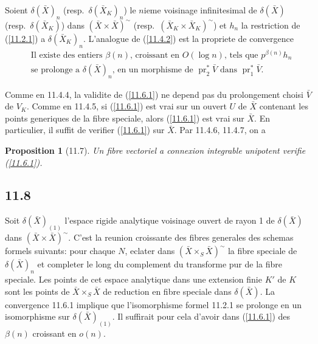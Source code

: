 \documentclass[12pt,a4paper]{article}
\theoremstyle{plain}
\newtheorem{proposition}[theorem]{Proposition}
\theoremstyle{definition}
\theoremstyle{remark}
\DeclareMathOperator{\pr}{pr}
\begin{document}
Soient $\delta(\bar{X})_n$ (resp.~$\delta(\bar{X}_K)_n$) le $n$ieme voisinage infinitesimal de $\delta(\bar{X})$ (resp.~$\delta(\bar{X}_K)$) dans $(\bar{X} \times \bar{X})^\sim$ (resp.~$(\bar{X}_K \times \bar{X}_K)^\sim$) et $h_n$ la restriction de (\ref{11.2.1}) a $\delta(\bar{X}_K)_n$. L'analogue de (\ref{11.4.2}) est la propriete de convergence
\begin{equation}\label{11.6.1}
\begin{aligned}
&\text{Il existe des entiers } \beta(n) \text{, croissant en } O(\log n) \text{, tels que } p^{\beta(n)} h_n \\
&\text{se prolonge a } \delta(\bar{X})_n \text{, en un morphisme de } \pr_2^* \bar{V} \text{ dans } \pr_1^* \bar{V}.
\end{aligned} \tag{11.6.1}
\end{equation}

Comme en 11.4.4, la validite de (\ref{11.6.1}) ne depend pas du prolongement choisi $\bar{V}$ de $V_K$. Comme en 11.4.5, si (\ref{11.6.1}) est vrai sur un ouvert $U$ de $\bar{X}$ contenant les points generiques de la fibre speciale, alors (\ref{11.6.1}) est vrai sur $\bar{X}$. En particulier, il suffit de verifier (\ref{11.6.1}) sur $\bar{X}$. Par 11.4.6, 11.4.7, on a

\begin{proposition}[11.7]
Un fibre vectoriel a connexion integrable unipotent verifie (\ref{11.6.1}).
\end{proposition}

\subsection*{11.8}

Soit $\delta(\bar{X})_{(1)}$ l'espace rigide analytique voisinage ouvert de rayon 1 de $\delta(\bar{X})$ dans $(\bar{X} \times \bar{X})^\sim$. C'est la reunion croissante des fibres generales des schemas formels suivants: pour chaque $N$, eclater dans $(\bar{X} \times_S \bar{X})^\sim$ la fibre speciale de $\delta(\bar{X})_n$ et completer le long du complement du transforme pur de la fibre speciale. Les points de cet espace analytique dans une extension finie $K'$ de $K$ sont les points de $\bar{X} \times_S \bar{X}$ de reduction en fibre speciale dans $\delta(\bar{X})$. La convergence 11.6.1 implique que l'isomorphisme formel 11.2.1 se prolonge en un isomorphisme sur $\delta(\bar{X})_{(1)}$. Il suffirait pour cela d'avoir dans (\ref{11.6.1}) des $\beta(n)$ croissant en $o(n)$.
\end{document}
